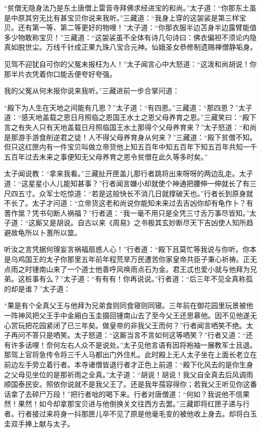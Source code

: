 \documentclass[12pt,UTF8]{ctexbook}
\begin{document}
“贫僧无隐身法乃是东土唐僧上雷音寺拜佛求经进宝的和尚。”太子道：“你那东土虽是中原其穷无比有甚宝贝你说来我听。”三藏道：“我身上穿的这袈裟是第三样宝贝。还有第一等、第二等更好的物哩！”太子道：“你那衣服半边苫身半边露臂能值多少物敢称宝贝！”三藏道：“这袈裟虽不全体有诗几句诗曰：佛衣偏袒不须论内隐真如脱世尘。万线千针成正果九珠八宝合元神。仙娥圣女恭修制遗赐禅僧静垢身。

见驾不迎犹自可你的父冤未报枉为人！”太子闻言心中大怒道：“这泼和尚胡说！你那半片衣凭着你口能舌便夸好夸强。

我的父冤从何未报你说来我听。”三藏进前一步合掌问道：

“殿下为人生在天地之间能有几恩？”太子道：“有四恩。”三藏道：“那四恩？”太子道：“感天地盖载之恩日月照临之恩国王水土之恩父母养育之恩。”三藏笑曰：“殿下言之有失人只有天地盖载日月照临国王水土那得个父母养育来？”太子怒道：“和尚是那游手游食削逆君之徒！人不得父母养育身从何来？”三藏道：“殿下贫僧不知。但只这红匣内有一件宝贝叫做立帝货他上知五百年中知五百年下知五百年共知一千五百年过去未来之事便知无父母养育之恩令贫僧在此久等多时矣。”

太子闻说教：“拿来我看。”三藏扯开匣盖儿那行者跳将出来呀呀的两边乱走。太子道：“这星星小人儿能知甚事？”行者闻言嫌小却就使个神通把腰伸一伸就长了有三尺四五寸。众军士吃惊道：“若是这般快长不消几日就撑破天也。”行者长到原身就不长了。太子才问道：“立帝货这老和尚说你能知未来过去吉凶你却有龟作卜？有蓍作筮？凭书句断人祸福？”行者道：“我一毫不用只是全凭三寸舌万事尽皆知。”太子道：“这厮又是胡说。自古以来《周易》之书极其玄妙断尽天下吉凶使人知所趋避故龟所以卜蓍所以筮。

听汝之言凭据何理妄言祸福扇惑人心！”行者道：“殿下且莫忙等我说与你听。你本是乌鸡国王的太子你那里五年前年程荒旱万民遭苦你家皇帝共臣子秉心祈祷。正无点雨之时锺南山来了一个道士他善呼风唤雨点石为金。君王忒也爱小就与他拜为兄弟。这桩事有么？”太子道：“有有有！你再说说。”行者道：“后三年不见全真称孤的却是谁？”太子道：

“果是有个全真父王与他拜为兄弟食则同食寝则同寝。三年前在御花园里玩景被他一阵神风把父王手中金厢白玉圭摄回锺南山去了至今父王还思慕他。因不见他遂无心赏玩把花园紧闭了已三年矣。做皇帝的非我父王而何？”行者闻言哂笑不绝。太子再问不答只是哂笑。太子怒道：“这厮当言不言如何这等哂笑？”行者又道：“还有许多话哩！奈何左右人众不是说处。”太子见他言语有因将袍袖一展教军士且退。那驾上官将急传令将三千人马都出门外住札。此时殿上无人太子坐在上面长老立在前边左手旁立着行者。本寺诸僧皆退行者才正色上前道：“殿下化风去的是你生身之父母见坐位的是那祈雨之全真。”太子道：“胡说！胡说！我父自全真去后风调雨顺国泰民安。照依你说就不是我父王了。还是我年孺容得你；若我父王听见你这番话拿了去碎尸万段！”把行者咄的喝下来。行者对唐僧道：“何如？我说他不信果然！果然！如今却拿那宝贝进与他倒换关文往西方去罢。”三藏即将红匣子递与行者。行者接过来将身一抖那匣儿卒不见了原是他毫毛变的被他收上身去。却将白玉圭双手捧上献与太子。
\end{document}
